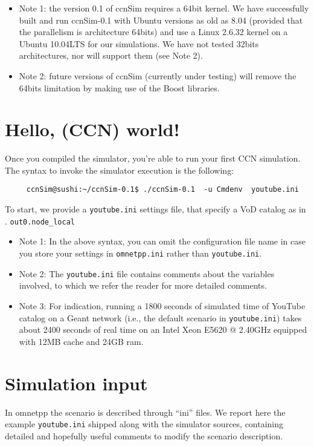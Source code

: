 \documentclass[10pt]{article}
\begin{document}
\begin{itemize}
\item Note 1: the version 0.1 of ccnSim requires a 64bit kernel. We have successfully built and run ccnSim-0.1 with Ubuntu versions as old as 8.04 (provided that the parallelism is  architecture 64bits) and use a Linux  2.6.32 kernel on a Ubuntu 10.04LTS for our simulations. We have not tested 32bits architectures, nor will support them (see Note 2).
\item Note 2: future versions of ccnSim (currently under testing) will remove the 64bits limitation by making use of the Boost libraries.
\end{itemize}



\section{Hello, (CCN) world!}
Once you compiled the simulator, you're able to run your first CCN simulation.
The syntax to invoke the simulator execution is the following:
\begin{verbatim}
     ccnSim@sushi:~/ccnSim-0.1$ ./ccnSim-0.1  -u Cmdenv  youtube.ini
\end{verbatim}

\noindent 
To start, we provide a \verb!youtube.ini! settings file, that specify a VoD catalog as in \cite{tr1,tr2,nomen}.
\verb!out0.node_local!\begin{itemize}
\item Note 1:  In the above syntax, you can omit the configuration file name in case you store your settings in \verb!omnetpp.ini! rather than \verb!youtube.ini!. 
\item Note 2:  The  \verb!youtube.ini!   file contains comments about the variables involved, to which we refer the reader for more detailed comments.
\item Note 3:  For indication, running a 1800 seconds of simulated time of YouTube catalog on a Geant network (i.e., the default scenario in \verb!youtube.ini!)  takes about 2400 seconds of real time on an Intel Xeon E5620 @ 2.40GHz equipped with  12MB cache and 24GB ram.
\end{itemize}

\section{Simulation input}
In omnetpp the scenario is described through ``ini'' files. We report here the example \verb!youtube.ini! shipped along with the simulator sources, containing detailed and hopefully useful comments to modify the scenario description.
\end{document}
